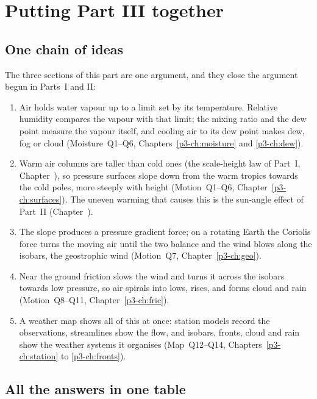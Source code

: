 \chapter{Putting Part III together}\label{p3-ch:revision}

\section{One chain of ideas}\label{p3-sec:chain}

The three sections of this part are one argument, and they close the argument begun in Parts~I and II:
\begin{enumerate}[itemsep=4pt]
\item Air holds water vapour up to a limit set by its temperature. Relative humidity compares the vapour with that limit; the mixing ratio and the dew point measure the vapour itself, and cooling air to its dew point makes dew, fog or cloud (Moisture~Q1--Q6, Chapters~\ref{p3-ch:moisture} and \ref{p3-ch:dew}).
\item Warm air columns are taller than cold ones (the scale-height law of Part~I, Chapter~), so pressure surfaces slope down from the warm tropics towards the cold poles, more steeply with height (Motion~Q1--Q6, Chapter~\ref{p3-ch:surfaces}). The uneven warming that causes this is the sun-angle effect of Part~II (Chapter~).
\item The slope produces a pressure gradient force; on a rotating Earth the Coriolis force turns the moving air until the two balance and the wind blows along the isobars, the geostrophic wind (Motion~Q7, Chapter~\ref{p3-ch:geo}).
\item Near the ground friction slows the wind and turns it across the isobars towards low pressure, so air spirals into lows, rises, and forms cloud and rain (Motion~Q8--Q11, Chapter~\ref{p3-ch:fric}).
\item A weather map shows all of this at once: station models record the observations, streamlines show the flow, and isobars, fronts, cloud and rain show the weather systems it organises (Map~Q12--Q14, Chapters~\ref{p3-ch:station} to \ref{p3-ch:fronts}).
\end{enumerate}

\section{All the answers in one table}\label{p3-sec:summary}

